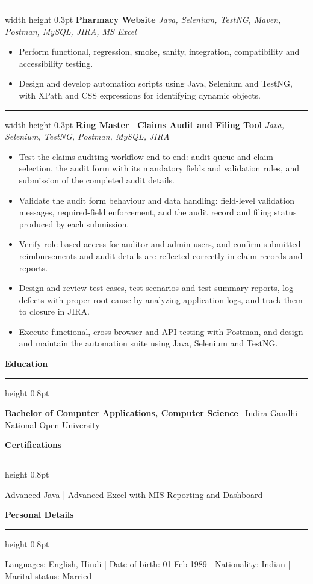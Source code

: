 \documentclass[10pt,a4paper]{article}
\newcommand{\sectionheader}[1]{%
    \vspace{4pt}
    {\normalsize\bfseries #1}
    \vspace{1pt}
    \hrule height 0.8pt
    \vspace{3pt}
}
\newcommand{\entrysep}{\vspace{3pt}\hrule width \hsize height 0.3pt\vspace{5pt}}
\begin{document}
\entrysep
\textbf{Pharmacy Website} \hfill \textit{Java, Selenium, TestNG, Maven, Postman, MySQL, JIRA, MS Excel}

\begin{itemize}
    \item Perform functional, regression, smoke, sanity, integration, compatibility and accessibility testing.
    \item Design and develop automation scripts using Java, Selenium and TestNG, with XPath and CSS expressions for identifying dynamic objects.
\end{itemize}

\entrysep
\textbf{Ring Master \textendash\ Claims Audit and Filing Tool} \hfill \textit{Java, Selenium, TestNG, Postman, MySQL, JIRA}

\begin{itemize}
    \item Test the claims auditing workflow end to end: audit queue and claim selection, the audit form with its mandatory fields and validation rules, and submission of the completed audit details.
    \item Validate the audit form behaviour and data handling: field-level validation messages, required-field enforcement, and the audit record and filing status produced by each submission.
    \item Verify role-based access for auditor and admin users, and confirm submitted reimbursements and audit details are reflected correctly in claim records and reports.
    \item Design and review test cases, test scenarios and test summary reports, log defects with proper root cause by analyzing application logs, and track them to closure in JIRA.
    \item Execute functional, cross-browser and API testing with Postman, and design and maintain the automation suite using Java, Selenium and TestNG.
\end{itemize}


\sectionheader{Education}

\textbf{Bachelor of Computer Applications, Computer Science} \textendash\ Indira Gandhi National Open University


\sectionheader{Certifications}

Advanced Java | Advanced Excel with MIS Reporting and Dashboard


\sectionheader{Personal Details}

Languages: English, Hindi | Date of birth: 01 Feb 1989 | Nationality: Indian | Marital status: Married
\end{document}
